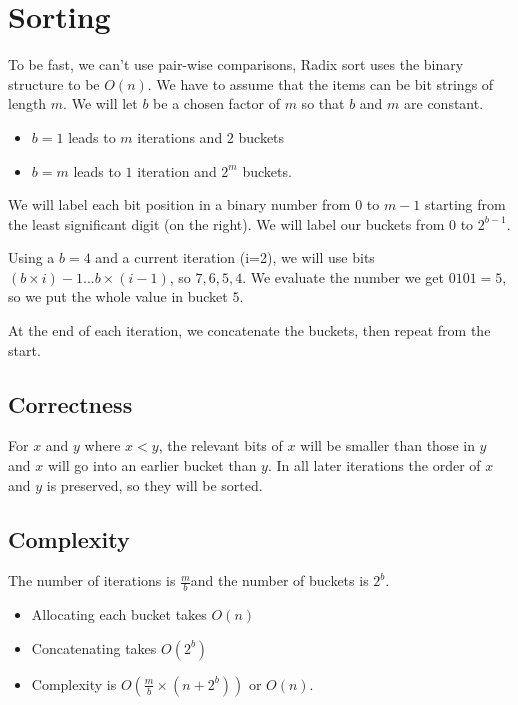 \section{Sorting}\label{sec:sorting_a}

To be fast, we can't use pair-wise comparisons, Radix sort uses the binary structure to be \(O(n)\).
We have to assume that the items can be bit strings of length \(m\).
We will let \(b\) be a chosen factor of \(m\) so that \(b\) and \(m\) are constant.
\begin{itemize}
    \item \(b=1\) leads to \(m\) iterations and \(2\) buckets
    \item \(b=m\) leads to \(1\) iteration and \(2^{m}\) buckets.
\end{itemize}

We will label each bit position in a binary number from \(0\) to \(m-1\) starting from the least significant digit (on the right).
We will label our buckets from \(0\) to \(2^{b-1}\).

Using a \(b=4\) and a current iteration (i=2), we will use bits \((b \times i)-1...b \times (i-1)\), so \(7, 6, 5, 4\).
We evaluate the number we get  \(0101 = 5\), so we put the whole value in bucket \(5\).

At the end of each iteration, we concatenate the buckets, then repeat from the start.

\subsection{Correctness}\label{sub:correctness}

For \(x\) and \(y\) where \(x<y\), the relevant bits of \(x\) will be smaller than those in \(y\) and \(x\) will go into an earlier bucket than \(y\).
In all later iterations the order of \(x\) and \(y\) is preserved, so they will be sorted.

\subsection{Complexity}\label{sub:complexity}

The number of iterations is \(\frac{m}{b}\)and the number of buckets is \(2^{b}\).
\begin{itemize}
    \item Allocating each bucket takes \(O(n)\)
    \item Concatenating takes \(O(2^{b})\)
    \item Complexity is \(O(\frac{m}{b} \times (n + 2^{b}))\) or \(O(n)\).
\end{itemize}

